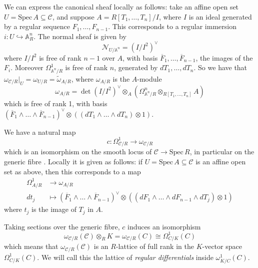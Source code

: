 \documentclass{article}
\theoremstyle{definition}
\theoremstyle{plain}
\theoremstyle{remark}
\newcommand{\spec}{\mathrm{Spec}\,}
\begin{document}
	We can express the canonical sheaf locally as follows: take an affine open set $U = \spec A\subseteq \mathcal{C}$, and suppose $A = R[T_1, \ldots, T_n]/I$, where $I$ is an ideal generated by a regular sequence $F_1, \ldots, F_{n-1}$. This corresponds to a regular immersion $i: U\hookrightarrow \mathbb{A}^n_R$. The normal sheaf is given by
	\[\mathcal{N}_{U/\mathbb{A}^n} = (I/I^2)^\vee\]
	where $I/I^2$ is free of rank $n-1$ over $A$, with basis $\overline{F}_1, \ldots, \overline{F}_{n-1}$, the images of the $F_i$. Moreover $\Omega^1_{\mathbb{A}^n/R}$ is free of rank $n$, generated by $dT_1, \ldots, dT_n$. So we have that $\omega_{\mathcal{C}/R}|_U = \omega_{U/R} = \widetilde{\omega}_{A/R}$, where $\omega_{A/R}$ is the $A$-module
	\[\omega_{A/R} = \det(I/I^2)^\vee \otimes_A (\Omega^n_{\mathbb{A}^n/R}\otimes_{R[T_1, \ldots, T_n]} A)\]
	which is free of rank 1, with basis $(\overline{F}_1\wedge \ldots \wedge \overline{F}_{n-1})^\vee \otimes ((dT_1 \wedge \ldots \wedge dT_n)\otimes 1)$.
	
	We have a natural map
	\[c: \Omega^1_{\mathcal{C}/R} \to \omega_{\mathcal{C}/R}\]
	which is an isomorphism on the smooth locus of $\mathcal{C}\to \spec R$, in particular on the generic fibre \cite[Corollary 6.4.13]{liu2002algebraic}. Locally it is given as follows: if $U = \spec A\subseteq \mathcal{C}$ is an affine open set as above, then this corresponds to a map
	\begin{align*}
		\Omega^1_{A/R}&\to \omega_{A/R}\\
		dt_j &\mapsto (\overline{F}_1\wedge \ldots \wedge \overline{F}_{n-1})^\vee \otimes ((dF_1\wedge \ldots \wedge dF_{n-1}\wedge dT_j)\otimes 1)
	\end{align*}
	where $t_j$ is the image of $T_j$ in $A$.
	
	Taking sections over the generic fibre, $c$ induces an isomorphism
	\[\omega_{\mathcal{C}/R}(\mathcal{C})\otimes_R K =\omega_{\mathcal{C}/R}(C) \cong \Omega^1_{C/K}(C)\]
	which means that $\omega_{\mathcal{C}/R}(\mathcal{C})$ is an $R$-lattice of full rank in the $K$-vector space $\Omega^1_{C/K}(C)$. We will call this the lattice of \emph{regular differentials} inside $\omega^1_{K/C}(C)$. 
	
\end{document}
